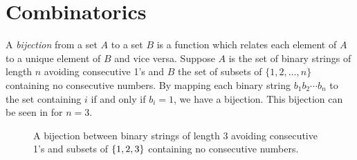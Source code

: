 \label{ch:backgr}
\section{Combinatorics\label{sec:combinatorics}}
A \emph{bijection} from a set $A$ to a set $B$ is a function which relates each element of $A$ to a unique element of $B$ and vice versa. Suppose $A$ is the set of binary strings of length $n$ avoiding consecutive 1's and $B$ the set of subsets of $\{1,2,\ldots,n\}$ containing no consecutive numbers. By mapping each binary string $b_1b_2\dotsm b_n$ to the set containing $i$ if and only if $b_i=1$, we have a bijection. This bijection can be seen in  for $n=3$.

\begin{figure}[ht!]
    \centering
    
    \caption{A bijection between binary strings of length 3 avoiding consecutive 1's and subsets of $\left\{1,2,3\right\}$ containing no consecutive numbers.}
    \label{fig:bijection_example}
\end{figure}

